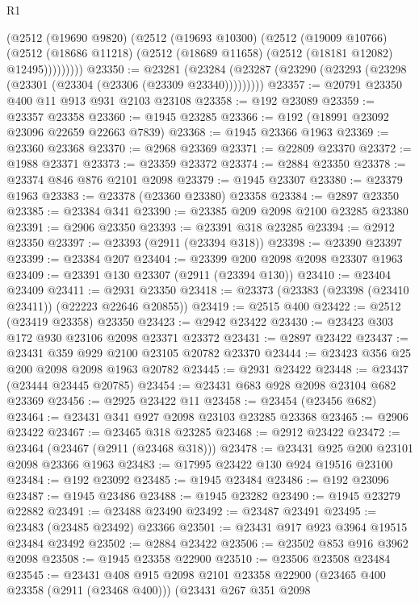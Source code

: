 \begin{lexlean}{R1}
\begin{coremodule}
          (@2512
            (@19690 @9820)
            (@2512
              (@19693 @10300)
              (@2512
                (@19009 @10766)
                (@2512 (@18686 @11218) (@2512 (@18689 @11658) (@2512 (@18181 @12082) @12495)))))))))
@23350 := @23281
    (@23284 (@23287 (@23290 (@23293 (@23298 (@23301 (@23304 (@23306 (@23309 @23340)))))))))
@23357 := @20791 @23350 @400 @11 @913 @931 @2103 @23108
@23358 := @192 @23089
@23359 := @23357 @23358
@23360 := @1945 @23285
@23366 := @192 (@18991 @23092 @23096 @22659 @22663 @7839)
@23368 := @1945 @23366 @1963
@23369 := @23360 @23368
@23370 := @2968 @23369
@23371 := @22809 @23370
@23372 := @1988 @23371
@23373 := @23359 @23372
@23374 := @2884 @23350
@23378 := @23374 @846 @876 @2101 @2098
@23379 := @1945 @23307
@23380 := @23379 @1963
@23383 := @23378 (@23360 @23380) @23358
@23384 := @2897 @23350
@23385 := @23384 @341
@23390 := @23385 @209 @2098 @2100 @23285 @23380
@23391 := @2906 @23350
@23393 := @23391 @318 @23285
@23394 := @2912 @23350
@23397 := @23393 (@2911 (@23394 @318))
@23398 := @23390 @23397
@23399 := @23384 @207
@23404 := @23399 @200 @2098 @2098 @23307 @1963
@23409 := @23391 @130 @23307 (@2911 (@23394 @130))
@23410 := @23404 @23409
@23411 := @2931 @23350
@23418 := @23373 (@23383 (@23398 (@23410 @23411)) (@22223 @22646 @20855))
@23419 := @2515 @400
@23422 := @2512 (@23419 @23358) @23350
@23423 := @2942 @23422
@23430 := @23423 @303 @172 @930 @23106 @2098 @23371 @23372
@23431 := @2897 @23422
@23437 := @23431 @359 @929 @2100 @23105 @20782 @23370
@23444 := @23423 @356 @25 @200 @2098 @2098 @1963 @20782
@23445 := @2931 @23422
@23448 := @23437 (@23444 @23445 @20785)
@23454 := @23431 @683 @928 @2098 @23104 @682 @23369
@23456 := @2925 @23422 @11
@23458 := @23454 (@23456 @682)
@23464 := @23431 @341 @927 @2098 @23103 @23285 @23368
@23465 := @2906 @23422
@23467 := @23465 @318 @23285
@23468 := @2912 @23422
@23472 := @23464 (@23467 (@2911 (@23468 @318)))
@23478 := @23431 @925 @200 @23101 @2098 @23366 @1963
@23483 := @17995 @23422 @130 @924 @19516 @23100
@23484 := @192 @23092
@23485 := @1945 @23484
@23486 := @192 @23096
@23487 := @1945 @23486
@23488 := @1945 @23282
@23490 := @1945 @23279 @22882
@23491 := @23488 @23490
@23492 := @23487 @23491
@23495 := @23483 (@23485 @23492) @23366
@23501 := @23431 @917 @923 @3964 @19515 @23484 @23492
@23502 := @2884 @23422
@23506 := @23502 @853 @916 @3962 @2098
@23508 := @1945 @23358 @22900
@23510 := @23506 @23508 @23484
@23545 := @23431
    @408
    @915
    @2098
    @2101
    @23358
    @22900
    (@23465 @400 @23358 (@2911 (@23468 @400)))
    (@23431
      @267
      @351
      @2098

\end{coremodule}
\end{lexlean}
